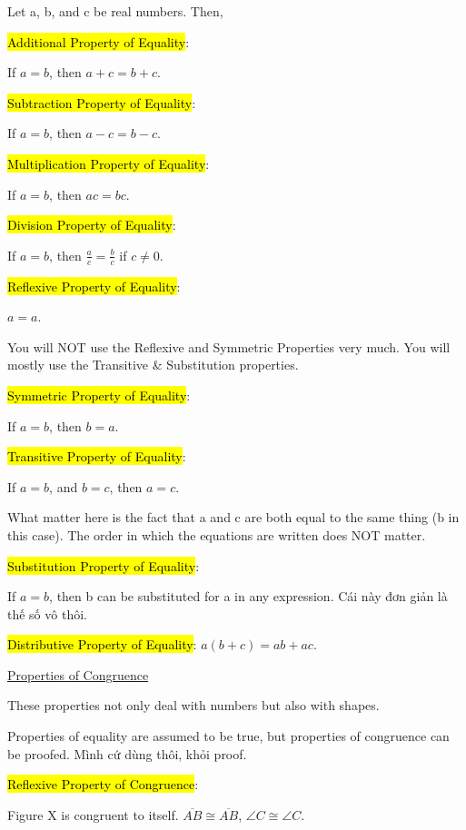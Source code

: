 Let a, b, and c be real numbers. Then,

\hl{Additional Property of Equality}:

If $a=b$, then $a+c=b+c$.

\hl{Subtraction Property of Equality}:

If $a=b$, then $a-c=b-c$.

\hl{Multiplication Property of Equality}:

If $a=b$, then $ac=bc$.

\hl{Division Property of Equality}:

If $a=b$, then $\frac{a}{c}=\frac{b}{c}$ if $c\neq 0$.

\hl{Reflexive Property of Equality}:

$a=a$.

You will NOT use the Reflexive and Symmetric Properties very much. You will mostly use the Transitive \& Substitution properties.

\hl{Symmetric Property of Equality}:

If $a=b$, then $b=a$.

\hl{Transitive Property of Equality}:

If $a=b$, and $b=c$, then $a=c$.

What matter here is the fact that a and c are both equal to the same thing (b in this case). The order in which the equations are written does NOT matter.

\hl{Substitution Property of Equality}:

If $a=b$, then b can be substituted for a in any expression. Cái này đơn giản là thế số vô thôi.

\hl{Distributive Property of Equality}: $a(b+c)=ab+ac$.

\vspace{0.5 cm}

\centerline{\underline{\LARGE Properties of Congruence}}

\vspace{0.5cm}

These properties not only deal with numbers but also with shapes.

Properties of equality are assumed to be true, but properties of congruence can be proofed. Mình cứ dùng thôi, khỏi proof.

\vspace{.3cm}

\hl{Reflexive Property of Congruence}:

Figure X is congruent to itself. $\overline{AB} \cong \overline{AB}$, $\angle C \cong \angle C$.

